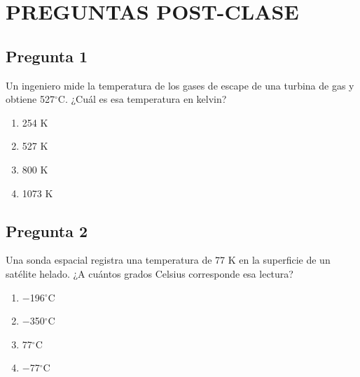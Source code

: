 \renewcommand{\tema}{Preguntas Post-Clase - Termodinámica}

\twocolumn
\section*{PREGUNTAS POST-CLASE}


\begin{preguntabox}
\subsection{Pregunta 1}
Un ingeniero mide la temperatura de los gases de escape de una turbina de gas y obtiene 527$^\circ$C. ¿Cuál es esa temperatura en kelvin?

\begin{enumerate}
    \item[A)] 254 K
    \item[B)] 527 K
    \item[C)] 800 K
    \item[D)] 1073 K
\end{enumerate}
\end{preguntabox}

\begin{preguntabox}
\subsection{Pregunta 2}
Una sonda espacial registra una temperatura de 77 K en la superficie de un satélite helado. ¿A cuántos grados Celsius corresponde esa lectura?

\begin{enumerate}
    \item[A)] $-$196$^\circ$C
    \item[B)] $-$350$^\circ$C
    \item[C)] 77$^\circ$C
    \item[D)] $-$77$^\circ$C
\end{enumerate}
\end{preguntabox}

